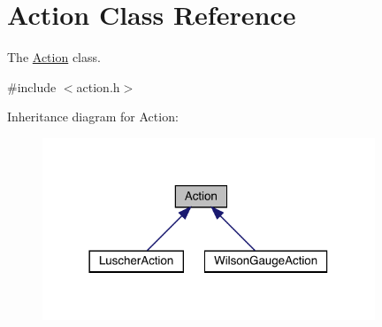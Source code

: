 \hypertarget{class_action}{}\section{Action Class Reference}
\label{class_action}


The \mbox{\hyperlink{class_action}{Action}} class.  




{\ttfamily \#include $<$action.\+h$>$}



Inheritance diagram for Action\+:\nopagebreak
\begin{figure}[H]
\begin{center}
\leavevmode
\includegraphics[width=282pt]{class_action__inherit__graph}
\end{center}
\end{figure}
